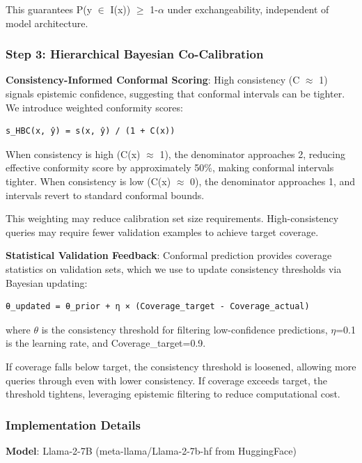 This guarantees P(y $\in$ I(x)) $\geq$ 1-$\alpha$ under exchangeability, independent of model architecture.

\subsubsection{Step 3: Hierarchical Bayesian Co-Calibration}

\textbf{Consistency-Informed Conformal Scoring}: High consistency (C $\approx$ 1) signals epistemic confidence, suggesting that conformal intervals can be tighter. We introduce weighted conformity scores:

\begin{verbatim}
s_HBC(x, ŷ) = s(x, ŷ) / (1 + C(x))
\end{verbatim}

When consistency is high (C(x) $\approx$ 1), the denominator approaches 2, reducing effective conformity score by approximately 50\%, making conformal intervals tighter. When consistency is low (C(x) $\approx$ 0), the denominator approaches 1, and intervals revert to standard conformal bounds.

This weighting may reduce calibration set size requirements. High-consistency queries may require fewer validation examples to achieve target coverage.

\textbf{Statistical Validation Feedback}: Conformal prediction provides coverage statistics on validation sets, which we use to update consistency thresholds via Bayesian updating:

\begin{verbatim}
θ_updated = θ_prior + η × (Coverage_target - Coverage_actual)
\end{verbatim}

where $\theta$ is the consistency threshold for filtering low-confidence predictions, $\eta$=0.1 is the learning rate, and Coverage\_target=0.9.

If coverage falls below target, the consistency threshold is loosened, allowing more queries through even with lower consistency. If coverage exceeds target, the threshold tightens, leveraging epistemic filtering to reduce computational cost.

\subsubsection{Implementation Details}

\textbf{Model}: Llama-2-7B (meta-llama/Llama-2-7b-hf from HuggingFace)


